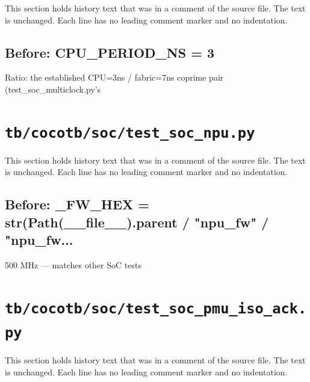 This section holds history text that was in a comment of the source file. The text is unchanged. Each line has no leading comment marker and no indentation.

\begin{record}

\subsection*{Before: CPU\_PERIOD\_NS = 3}

\begin{textblock}
Ratio: the established CPU=3ns / fabric=7ns coprime pair (test_soc_multiclock.py's
\end{textblock}

\end{record}

\section{\texttt{tb/cocotb/soc/test\_soc\_npu.py}}\label{cr:suite:soc-test-soc-npu}

This section holds history text that was in a comment of the source file. The text is unchanged. Each line has no leading comment marker and no indentation.

\begin{record}

\subsection*{Before: \_FW\_HEX = str(Path(\_\_file\_\_).parent / "npu\_fw" / "npu\_fw...}

\begin{textblock}
500 MHz — matches other SoC tests
\end{textblock}

\end{record}

\section{\texttt{tb/cocotb/soc/test\_soc\_pmu\_iso\_ack.py}}\label{cr:suite:soc-test-soc-pmu-iso-ack}

This section holds history text that was in a comment of the source file. The text is unchanged. Each line has no leading comment marker and no indentation.

